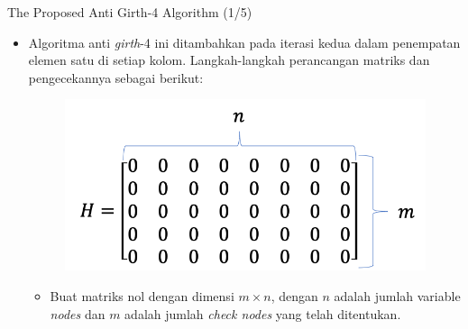 \documentclass[11pt, aspectratio=169]{beamer}
\begin{document}
\begin{frame}{The Proposed Anti Girth-4 Algorithm (1/5)}

\centering 
\begin{itemize}
\item Algoritma anti \textit{girth}-4 ini ditambahkan pada iterasi kedua dalam penempatan elemen satu di setiap kolom. Langkah-langkah perancangan matriks dan pengecekannya sebagai berikut:
\begin{figure}
				\centering 
			\includegraphics[scale=0.5]{gambarafa/step1}
			\centering 
		\end{figure}
\begin{itemize}
	\item[1.] Buat matriks nol dengan dimensi $m\times n$, dengan $n$ adalah jumlah variable \textit{nodes} dan $m$ adalah jumlah \textit{check nodes} yang telah ditentukan.
\end{itemize}


\end{itemize}
\end{frame}
\end{document}
